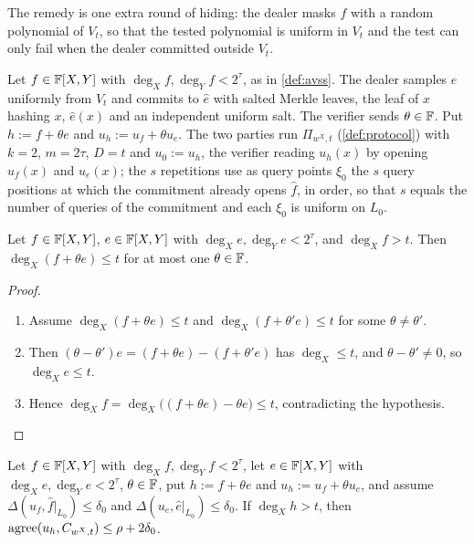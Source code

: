 The remedy is one extra round of hiding: the dealer masks $f$ with a random polynomial of
$V_t$, so that the tested polynomial is uniform in $V_t$ and the test can only fail when the
dealer committed outside $V_t$.

{\sloppy
\begin{construction}\label{con:avss-mask}
Let $f\in\mathbb{F}[X,Y]$ with $\deg_Xf,\deg_Yf<2^\tau$, as in \cref{def:avss}. The dealer samples $e$
uniformly from $V_t$ and commits to $\hat e$ with salted Merkle leaves, the leaf of $x$ hashing
$x$, $\hat e(x)$ and an independent uniform salt. The verifier sends $\theta\in\mathbb{F}$. Put
$h:=f+\theta e$ and $u_h:=u_f+\theta u_e$. The two parties run $\Pi_{w^X,t}$ (\cref{def:protocol})
with $k=2$, $m=2\tau$, $D=t$ and $u_0:=u_h$, the verifier reading $u_h(x)$ by opening $u_f(x)$
and $u_e(x)$; the $s$ repetitions use as query points $\xi_0$ the $s$ query positions
at which the commitment already opens $\hat f$, in order, so that $s$ equals the number of queries of the commitment and each $\xi_0$ is uniform on $L_0$.
\end{construction}\par}

\begin{lemma}\label{lem:avss-bad}
Let $f\in\mathbb{F}[X,Y]$, $e\in\mathbb{F}[X,Y]$ with $\deg_Xe,\deg_Ye<2^\tau$, and $\deg_Xf>t$. Then $\deg_X(f+\theta e)\le t$ for at most one
$\theta\in\mathbb{F}$.
\end{lemma}

\begin{proof}
\begin{enumerate}
\item Assume $\deg_X(f+\theta e)\le t$ and $\deg_X(f+\theta'e)\le t$ for some $\theta\ne\theta'$.
\item Then $(\theta-\theta')e=(f+\theta e)-(f+\theta'e)$ has $\deg_X\le t$, and
$\theta-\theta'\ne0$, so $\deg_Xe\le t$.
\item Hence $\deg_Xf=\deg_X\big((f+\theta e)-\theta e\big)\le t$, contradicting the hypothesis.
\end{enumerate}
\end{proof}

\begin{lemma}\label{lem:avss-dist}
Let $f\in\mathbb{F}[X,Y]$ with $\deg_Xf,\deg_Yf<2^\tau$, let $e\in\mathbb{F}[X,Y]$ with $\deg_Xe,\deg_Ye<2^\tau$, $\theta\in\mathbb{F}$, put
$h:=f+\theta e$ and $u_h:=u_f+\theta u_e$, and assume $\Delta(u_f,\hat f|_{L_0})\le\delta_0$ and
$\Delta(u_e,\hat e|_{L_0})\le\delta_0$. If $\deg_Xh>t$, then
$\mathrm{agree}(u_h,C_{w^X,t})\le\rho+2\delta_0$.
\end{lemma}

